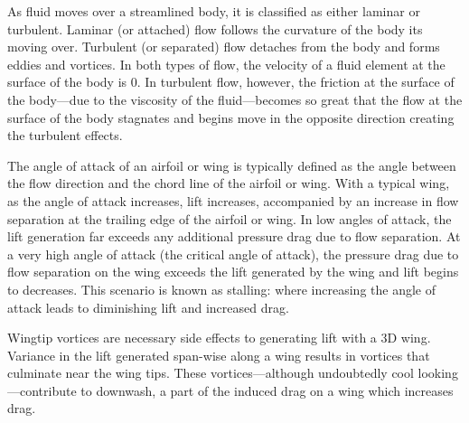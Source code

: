 As fluid moves over a streamlined body, it is classified as either laminar or turbulent. Laminar (or attached) flow follows the curvature of the body its moving over. Turbulent (or separated) flow detaches from the body and forms eddies and vortices. In both types of flow, the velocity of a fluid element at the surface of the body is \num{0}. In turbulent flow, however, the friction at the surface of the body—due to the viscosity of the fluid—becomes so great that the flow at the surface of the body stagnates and begins move in the opposite direction creating the turbulent effects.

The angle of attack of an airfoil or wing is typically defined as the angle between the flow direction and the chord line of the airfoil or wing. With a typical  wing, as the angle of attack increases, lift increases, accompanied by an increase in flow separation at the trailing edge of the airfoil or wing. In low angles of attack, the lift generation far exceeds any additional pressure drag due to flow separation. At a very high angle of attack (the critical angle of attack), the pressure drag due to flow separation on the wing exceeds the lift generated by the wing and lift begins to decreases. This scenario is known as stalling: where increasing the angle of attack leads to diminishing lift and increased drag.

Wingtip vortices are necessary side effects to generating lift with a 3D wing. Variance in the lift generated span-wise along a wing results in vortices that culminate near the wing tips. These vortices—although undoubtedly cool looking—contribute to downwash, a part of the induced drag on a wing which increases drag.